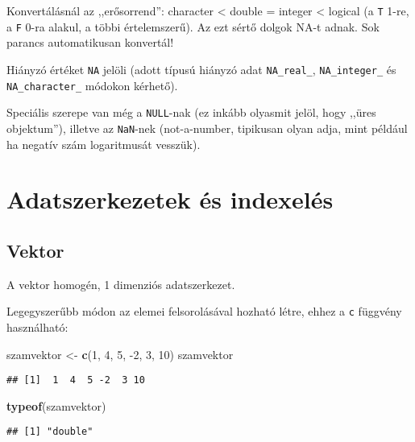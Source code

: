 \documentclass[
]{book}
\newenvironment{Shaded}{\begin{snugshade}}{\end{snugshade}}
\newcommand{\DecValTok}[1]{\textcolor[rgb]{0.00,0.00,0.81}{#1}}
\newcommand{\KeywordTok}[1]{\textcolor[rgb]{0.13,0.29,0.53}{\textbf{#1}}}
\newcommand{\NormalTok}[1]{#1}
\newcommand{\StringTok}[1]{\textcolor[rgb]{0.31,0.60,0.02}{#1}}
\begin{document}
Konvertálásnál az ,,erősorrend'': character \textless{} double = integer \textless{} logical (a \texttt{T} 1-re, a \texttt{F} 0-ra alakul, a többi értelemszerű). Az ezt sértő dolgok NA-t adnak. Sok parancs automatikusan konvertál!

Hiányzó értéket \texttt{NA} jelöli (adott típusú hiányzó adat \texttt{NA\_real\_}, \texttt{NA\_integer\_} és \texttt{NA\_character\_} módokon kérhető).

Speciális szerepe van még a \texttt{NULL}-nak (ez inkább olyasmit jelöl, hogy ,,üres objektum''), illetve az \texttt{NaN}-nek (not-a-number, tipikusan olyan adja, mint például ha negatív szám logaritmusát vesszük).

\hypertarget{adatszerkezetek-uxe9s-indexeluxe9s}{%
\section{Adatszerkezetek és indexelés}\label{adatszerkezetek-uxe9s-indexeluxe9s}}

\hypertarget{vektor}{%
\subsection{Vektor}\label{vektor}}

A vektor homogén, 1 dimenziós adatszerkezet.

Legegyszerűbb módon az elemei felsorolásával hozható létre, ehhez a \texttt{c} függvény használható:

\begin{Shaded}
\begin{Highlighting}[]
\NormalTok{szamvektor <-}\StringTok{ }\KeywordTok{c}\NormalTok{(}\DecValTok{1}\NormalTok{, }\DecValTok{4}\NormalTok{, }\DecValTok{5}\NormalTok{, }\DecValTok{-2}\NormalTok{, }\DecValTok{3}\NormalTok{, }\DecValTok{10}\NormalTok{)}
\NormalTok{szamvektor}
\end{Highlighting}
\end{Shaded}

\begin{verbatim}
## [1]  1  4  5 -2  3 10
\end{verbatim}

\begin{Shaded}
\begin{Highlighting}[]
\KeywordTok{typeof}\NormalTok{(szamvektor)}
\end{Highlighting}
\end{Shaded}

\begin{verbatim}
## [1] "double"
\end{verbatim}
\end{document}
